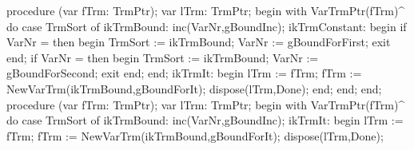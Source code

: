procedure (var fTrm: TrmPtr);
var
   lTrm: TrmPtr;
begin
   with VarTrmPtr(fTrm)^ do
      case TrmSort of
         ikTrmBound: inc(VarNr,gBoundInc);
         ikTrmConstant:
            begin
               if VarNr =  then
               begin TrmSort := ikTrmBound; VarNr := gBoundForFirst; exit end;
               if VarNr =  then
               begin TrmSort := ikTrmBound; VarNr := gBoundForSecond; exit end;
            end;
         ikTrmIt:
            begin lTrm := fTrm; fTrm := NewVarTrm(ikTrmBound,gBoundForIt);
            dispose(lTrm,Done);
            end;
      end;
end;
\eatline
{}\nwendcode{}\nwdocspar
\nwenddocs{}\endmoddef\nwstartdeflinemarkup{}\nwenddeflinemarkup
procedure (var fTrm: TrmPtr);
var
   lTrm: TrmPtr;
begin
   with VarTrmPtr(fTrm)^ do
      case TrmSort of
         ikTrmBound: inc(VarNr,gBoundInc);
         ikTrmIt:
            begin
               lTrm := fTrm;
               fTrm := NewVarTrm(ikTrmBound,gBoundForIt);
               dispose(lTrm,Done);
